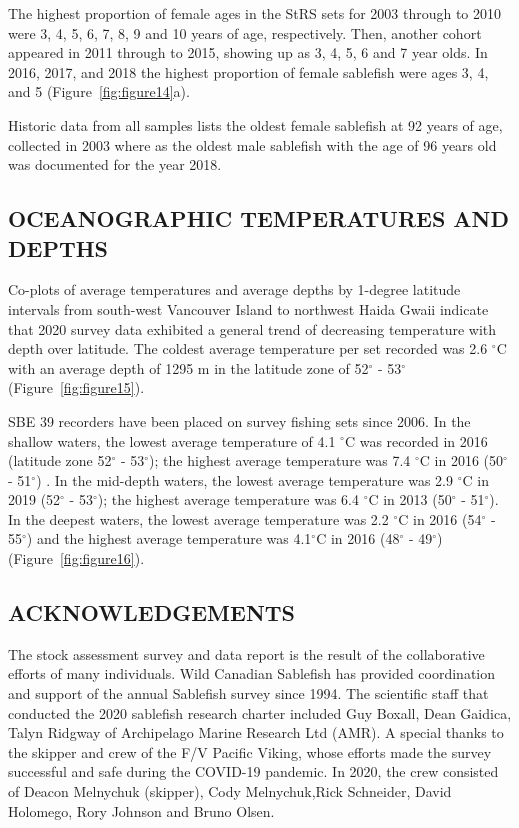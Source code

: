 \documentclass[12pt]{article}\usepackage[]{graphicx}\usepackage[]{color}
\begin{document}
The highest proportion of female ages in the StRS sets for 2003 through to 2010 were 3, 4, 5, 6, 7, 8, 9 and 10 years of age, respectively. Then, another cohort appeared in 2011 through to 2015, showing up as 3, 4, 5, 6 and 7 year olds. In 2016, 2017, and 2018 the highest proportion of female sablefish were ages 3, 4, and 5 (Figure~\ref{fig:figure14}a).

Historic data from all samples lists the oldest female sablefish at 92 years of age, collected in 2003 where as the oldest male sablefish with the age of 96 years old was documented for the year 2018.

\hypertarget{oceanographic-temperatures-and-depths}{%
\subsection{OCEANOGRAPHIC TEMPERATURES AND DEPTHS}\label{oceanographic-temperatures-and-depths}}

Co-plots of average temperatures and average depths by 1-degree latitude intervals from south-west Vancouver Island to northwest Haida Gwaii indicate that 2020 survey data exhibited a general trend of decreasing temperature with depth over latitude. The coldest average temperature per set recorded was 2.6 \(^\circ\)C with an average depth of 1295 m in the latitude zone of 52\(^\circ\) - 53\(^\circ\) (Figure~\ref{fig:figure15}).

SBE 39 recorders have been placed on survey fishing sets since 2006. In the shallow waters, the lowest average temperature of 4.1 \(^\circ\)C was recorded in 2016 (latitude zone 52\(^\circ\) - 53\(^\circ\)); the highest average temperature was 7.4 \(^\circ\)C in 2016 (50\(^\circ\) - 51\(^\circ\)) . In the mid-depth waters, the lowest average temperature was 2.9 \(^\circ\)C in 2019 (52\(^\circ\) - 53\(^\circ\)); the highest average temperature was 6.4 \(^\circ\)C in 2013 (50\(^\circ\) - 51\(^\circ\)). In the deepest waters, the lowest average temperature was 2.2 \(^\circ\)C in 2016 (54\(^\circ\) - 55\(^\circ\)) and the highest average temperature was 4.1\(^\circ\)C in 2016 (48\(^\circ\) - 49\(^\circ\)) (Figure~\ref{fig:figure16}).

\hypertarget{acknowledgements}{%
\subsection{ACKNOWLEDGEMENTS}\label{acknowledgements}}

The stock assessment survey and data report is the result of the collaborative efforts of many individuals. Wild Canadian Sablefish has provided coordination and support of the annual Sablefish survey since 1994. The scientific staff that conducted the 2020 sablefish research charter included Guy Boxall, Dean Gaidica, Talyn Ridgway of Archipelago Marine Research Ltd (AMR). A special thanks to the skipper and crew of the F/V Pacific Viking, whose efforts made the survey successful and safe during the COVID-19 pandemic. In 2020, the crew consisted of Deacon Melnychuk (skipper), Cody Melnychuk,Rick Schneider, David Holomego, Rory Johnson and Bruno Olsen.
\end{document}
